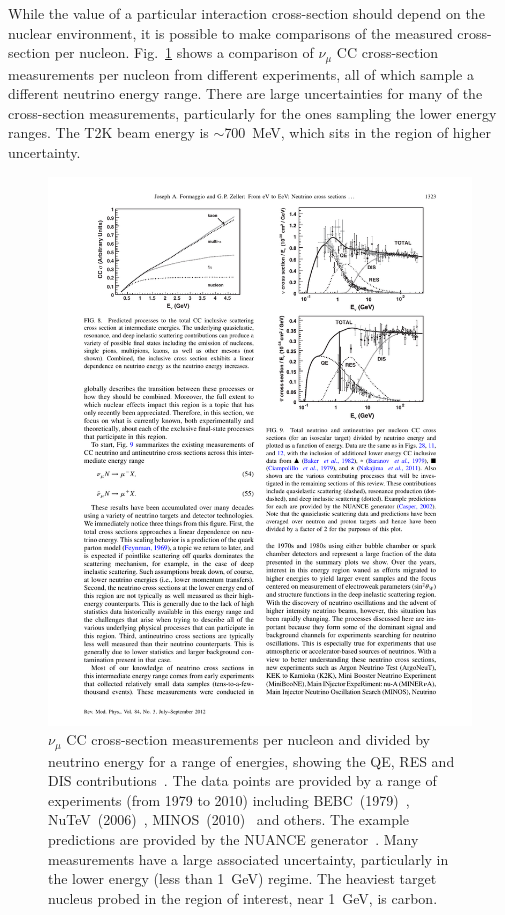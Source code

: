 \newline
\newline
While the value of a particular interaction cross-section should depend on the nuclear environment, it is possible to make comparisons of the measured cross-section per nucleon.  Fig.~\ref{fig:CrossSectionMeasurements} shows a comparison of $\nu_\mu$ CC cross-section measurements per nucleon from different experiments, all of which sample a different neutrino energy range.  There are large uncertainties for many of the cross-section measurements, particularly for the ones sampling the lower energy ranges.  The T2K beam energy is $\sim$700~MeV, which sits in the region of higher uncertainty.
\begin{figure}[b]%
  \centering
  \includegraphics[width=12cm]{images/neutrino_interactions/CrossSectionMeasurements.pdf}
  \caption{$\nu_\mu$ CC cross-section measurements per nucleon and divided by neutrino energy for a range of energies, showing the QE, RES and DIS contributions~\cite{RevModPhys.84.1307}.  The data points are provided by a range of experiments (from 1979 to 2010) including BEBC~(1979)~\cite{Colley:1979rt}, NuTeV~(2006)~\cite{PhysRevD.74.012008}, MINOS~(2010)~\cite{PhysRevD.81.072002} and others.  The example predictions are provided by the NUANCE generator~\cite{Casper:2002sd}.  Many measurements have a large associated uncertainty, particularly in the lower energy (less than 1~GeV) regime.  The heaviest target nucleus probed in the region of interest, near 1~GeV, is carbon.}
  \label{fig:CrossSectionMeasurements}
\end{figure}
